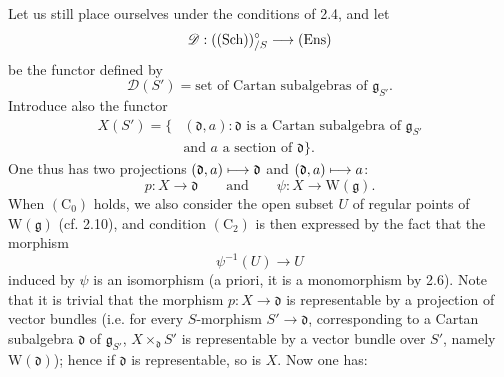 Let us still place ourselves under the conditions of 2.4, and let
\[
 \mathscr D:(\textup{(Sch)})^\circ_{/S}\longrightarrow\textup{(Ens)}
\]
be the functor defined by
\[
 \mathscr D(S')=\text{set of Cartan subalgebras of }\mathfrak g_{S'}.
\]
Introduce also the functor
\[
\begin{aligned}
 X(S')=\{&(\mathfrak d,a):\mathfrak d\text{ is a Cartan subalgebra of }\mathfrak g_{S'}\\
 &\text{and }a\text{ a section of }\mathfrak d\}.
\end{aligned}
\]
One thus has two projections $(\mathfrak d,a)\longmapsto\mathfrak d$ and
$(\mathfrak d,a)\longmapsto a$:
\[
 p:X\longrightarrow\mathfrak d\qquad\text{and}\qquad
 \psi:X\longrightarrow\mathrm W(\mathfrak g).
\]
When $(\mathrm C_0)$ holds, we also consider the open subset $U$
of regular points of $\mathrm W(\mathfrak g)$ (cf. 2.10), and
condition $(\mathrm C_2)$ is then expressed by the fact that the
morphism
\[
 \psi^{-1}(U)\longrightarrow U
\]
induced by $\psi$ is an isomorphism (a priori, it is a monomorphism
by 2.6). Note that it is trivial that the morphism
$p:X\to\mathfrak d$ is representable by a projection of vector
bundles (i.e. for every $S$-morphism $S'\to\mathfrak d$,
corresponding to a Cartan subalgebra $\mathfrak d$ of
$\mathfrak g_{S'}$, $X\times_{\mathfrak d}S'$ is representable
by a vector bundle over $S'$, namely $\mathrm W(\mathfrak d)$);
hence if $\mathfrak d$ is representable, so is $X$. Now one has:

